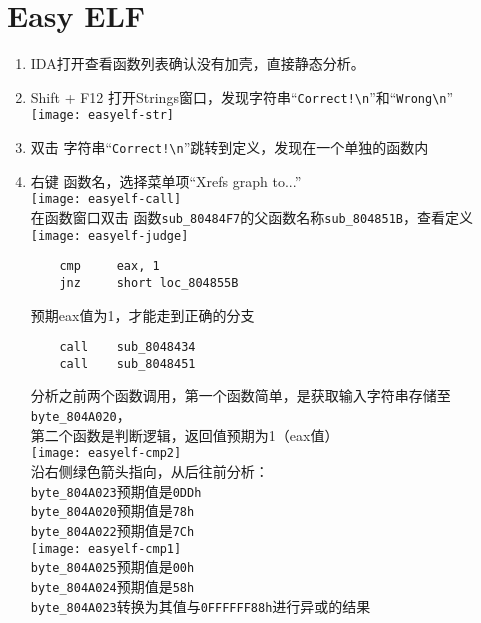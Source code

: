 \section{Easy ELF}
\begin{enumerate}
\item  IDA打开查看函数列表确认没有加壳，直接静态分析。\\
\item Shift + F12 打开Strings窗口，发现字符串“\lstinline$Correct!\n$”和“\lstinline$Wrong\n$”\\
	\texttt{[image: easyelf-str]} \\
\item 双击 字符串“\lstinline$Correct!\n$”跳转到定义，发现在一个单独的函数内 \\
\item 右键 函数名，选择菜单项“Xrefs graph to...” \\
	\texttt{[image: easyelf-call]} \\
	在函数窗口双击 函数\lstinline$sub_80484F7$的父函数名称\lstinline$sub_804851B$，查看定义 \\
	\texttt{[image: easyelf-judge]} \\
	\begin{lstlisting}
	cmp     eax, 1
	jnz     short loc_804855B
	\end{lstlisting}
	预期eax值为1，才能走到正确的分支 \\
	\begin{lstlisting}
	call    sub_8048434
	call    sub_8048451
	\end{lstlisting}
	分析之前两个函数调用，第一个函数简单，是获取输入字符串存储至\lstinline$byte_804A020$，\\
	第二个函数是判断逻辑，返回值预期为1（eax值）\\
	\texttt{[image: easyelf-cmp2]} \\
	沿右侧绿色箭头指向，从后往前分析：\\
	\lstinline$byte_804A023$预期值是\lstinline$0DDh$ \\
	\lstinline$byte_804A020$预期值是\lstinline$78h$ \\
	\lstinline$byte_804A022$预期值是\lstinline$7Ch$ \\
	\texttt{[image: easyelf-cmp1]} \\
	\lstinline$byte_804A025$预期值是\lstinline$00h$ \\
	\lstinline$byte_804A024$预期值是\lstinline$58h$ \\
	\lstinline$byte_804A023$转换为其值与\lstinline$0FFFFFF88h$进行异或的结果\\

\end{enumerate}
